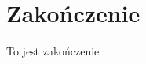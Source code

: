 \documentclass[document.tex]{subfiles}
\begin{document}
\chapter{Zakończenie}
To jest zakończenie
\end{document}
